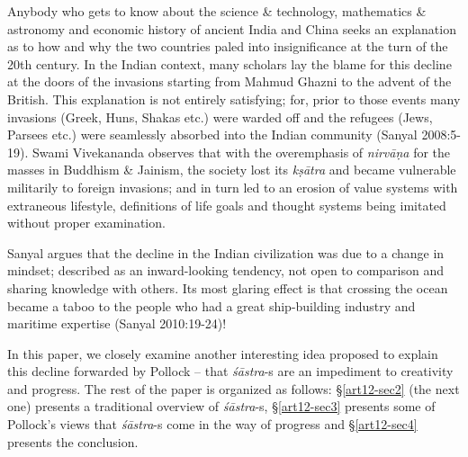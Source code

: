 \newpage

Anybody who gets to know about the science \& technology, mathematics \& astronomy and economic history of ancient India and China seeks an explanation as to how and why the two countries paled into insigniﬁcance at the turn of the 20th century. In the Indian context, many scholars lay the blame for this decline at the doors of the invasions starting from Mahmud Ghazni to the advent of the British. This explanation is not entirely satisfying; for, prior to those events many invasions (Greek, Huns, Shakas etc.) were warded off and the refugees (Jews, Parsees etc.) were seamlessly absorbed into the Indian community (Sanyal 2008:5-19). Swami Vivekananda  observes that with the overemphasis of {\sl nirvāṇa} for the masses in Buddhism \& Jainism, the society lost its {\sl kṣātra} and became vulnerable militarily to foreign invasions; and in turn led to an erosion of value systems with extraneous lifestyle, definitions of life goals and thought systems being imitated without proper examination. 

Sanyal  argues that the decline in the Indian civilization was due to a change in mindset; described as an inward-looking tendency, not open to comparison and sharing knowledge with others. Its most glaring effect is that crossing the ocean became a taboo to the people who had a great ship-building industry and maritime expertise (Sanyal 2010:19-24)!

In this paper, we closely examine another interesting idea proposed to explain this decline forwarded by Pollock -- that {\sl śāstra}-s are an impediment to creativity and progress. The rest of the paper is organized as follows: \S\ref{art12-sec2} (the next one) presents a traditional overview of {\sl śāstra}-s, \S\ref{art12-sec3} presents some of Pollock's views that {\sl śāstra}-s come in the way of progress and \S\ref{art12-sec4} presents the conclusion.\\[-20pt]

